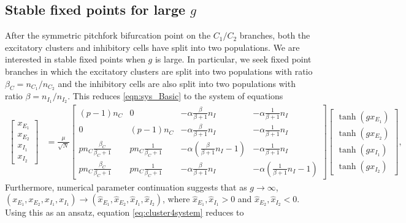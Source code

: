 \documentclass[reqno]{siamonline190516}
\begin{document}
\subsection{Stable fixed points for large \texorpdfstring{$g$}{g}}

After the symmetric pitchfork bifurcation point on the $C_1/C_2$ branches, both the excitatory clusters and inhibitory cells have split into two populations. We are interested in stable fixed points when $g$ is large. In particular, we seek fixed point branches in which the excitatory clusters are split into two populations with ratio $\beta_C = n_{C_1}/n_{C_2}$ and the inhibitory cells are also split into two populations with ratio $\beta = n_{I_1}/n_{I_2}$. This reduces \cref{eqn:sys_Basic} to the system of equations
\begin{equation}\label{eq:cluster4system}
    \begin{aligned}
    \begin{bmatrix} x_{E_1} \\ x_{E_2} \\ x_{I_1} \\ x_{I_2} \end{bmatrix} 
    &= \frac{\mu}{\sqrt{N}} 
    \begin{bmatrix} 
       (p-1)n_C & 0 & -\alpha \frac{\beta}{\beta+1}n_I &  -\alpha \frac{1}{\beta+1}n_I \\
       0  & (p-1)n_C & -\alpha \frac{\beta}{\beta+1}n_I &  -\alpha \frac{1}{\beta+1}n_I \\
       p n_C \frac{\beta_C}{\beta_C+1} &
       p n_C \frac{1}{\beta_C+1} &
       -\alpha \left(\frac{\beta}{\beta+1}n_I-1\right) &  -\alpha \frac{1}{\beta+1}n_I \\
       p n_C \frac{\beta_C}{\beta_C+1} &
       p n_C \frac{1}{\beta_C+1} &
       -\alpha \frac{\beta}{\beta+1}n_I & -\alpha \left(\frac{1}{\beta+1}n_I - 1 \right)
    \end{bmatrix}
    \begin{bmatrix} \tanh(g x_{E_1}) \\ \tanh ( g x_{E_2} ) \\\tanh(g x_{I_1}) \\\tanh(g x_{I_2})  \end{bmatrix},
    \end{aligned}
\end{equation}
Furthermore, numerical parameter continuation suggests that as $g \rightarrow \infty$, $(x_{E_1}, x_{E_2}, x_{I_1}, x_{I_1}) \rightarrow (\hat{x}_{E_1}, \hat{x}_{E_2}, \hat{x}_{I_1}, \hat{x}_{I_2})$, where $\hat{x}_{E_1}, \hat{x}_{I_1} > 0$ and $\hat{x}_{E_2}, \hat{x}_{I_2} < 0$. Using this as an ansatz, equation \cref{eq:cluster4system} reduces to 
\end{document}
